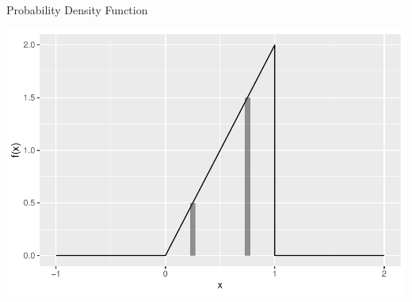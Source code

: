 \begin{frame}
  \begin{block}{\examplectd}
    \begin{center}
      Probability Density Function

      \includegraphics[height=.7\textheight]{figure/example-16-1b-1}
    \end{center}
  \end{block}
\end{frame}

      
      
      
        
      


%
%


